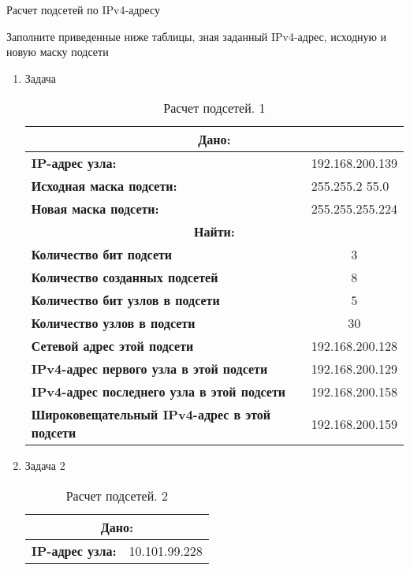 \documentclass[a4paper,14pt]{extarticle}
\begin{document}
\begin{mypart}{Расчет подсетей по IPv4-адресу}
	
	\begin{step}{Заполните приведенные ниже таблицы, зная заданный IPv4-адрес, исходную и
			новую маску подсети}
		\begin{enumerate}
			\item Задача
	
		
\begin{table}[h!]
		\caption{Расчет подсетей. 1}
		\centering
		\begin{tabular}{|l|l|}
			\hline
			\multicolumn{2}{|c|}{\textbf{Дано:}}  \\ \hline
			\multicolumn{ 1}{|l|}{\textbf{IP-адрес узла:}} & 192.168.200.139 \\ \hline
			\textbf{Исходная маска подсети:} & 255.255.2	55.0 \\ \hline
			\textbf{Новая маска подсети:} & 255.255.255.224 \\ \hline
			\multicolumn{2}{|c|}{\textbf{Найти:}}  \\ \hline
			\multicolumn{ 1}{|l|}{\textbf{Количество бит подсети}} & \multicolumn{1}{c|}{3}\\  \hline
			\textbf{Количество созданных подсетей} & \multicolumn{1}{c|}{8} \\ \hline
			\textbf{Количество бит узлов в подсети} & \multicolumn{1}{c|}{5} \\ \hline
			\textbf{Количество узлов в подсети} & \multicolumn{1}{c|}{30} \\ \hline
			\textbf{Сетевой адрес этой подсети} & 192.168.200.128 \\ \hline
			\textbf{IPv4-адрес первого узла в этой подсети} & 192.168.200.129 \\ \hline
			\textbf{IPv4-адрес последнего узла в этой подсети} & 192.168.200.158 \\ \hline
			\textbf{Широковещательный IPv4-адрес в этой подсети} & 192.168.200.159 \\ \hline
		\end{tabular}
		\label{}
	\end{table}
\newpage
\item Задача 2
\begin{table}[h!]
		\centering
		\caption{Расчет подсетей. 2}
	\begin{tabular}{|l|l|}
		\hline
			\multicolumn{2}{|c|}{\textbf{Дано:}}  \\ \hline
		\textbf{IP-адрес узла:} & 10.101.99.228 \\ \hline

\end{tabular}
\end{table}
\end{enumerate}
\end{step}
\end{mypart}
\end{document}
